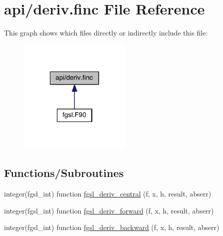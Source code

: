 \hypertarget{deriv_8finc}{\section{api/deriv.finc File Reference}
\label{deriv_8finc}
}
This graph shows which files directly or indirectly include this file\-:\nopagebreak
\begin{figure}[H]
\begin{center}
\leavevmode
\includegraphics[width=152pt]{deriv_8finc__dep__incl}
\end{center}
\end{figure}
\subsection*{Functions/\-Subroutines}
\begin{DoxyCompactItemize}
\item 
integer(fgsl\-\_\-int) function \hyperlink{deriv_8finc_ac8be2c24bb08d1a46d9b9f941c2f8221}{fgsl\-\_\-deriv\-\_\-central} (f, x, h, result, abserr)
\item 
integer(fgsl\-\_\-int) function \hyperlink{deriv_8finc_ae36c355d73cf6e494e5bf2ce531ff400}{fgsl\-\_\-deriv\-\_\-forward} (f, x, h, result, abserr)
\item 
integer(fgsl\-\_\-int) function \hyperlink{deriv_8finc_ace2b5daaf357f4504c73ebb5f1be2864}{fgsl\-\_\-deriv\-\_\-backward} (f, x, h, result, abserr)
\end{DoxyCompactItemize}


